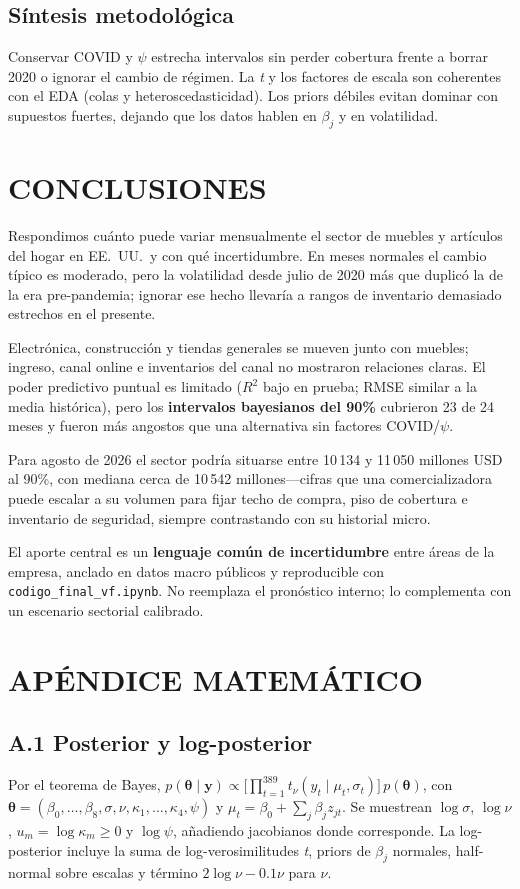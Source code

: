 \documentclass[twocolumn,10pt]{article}
\begin{document}
\subsection{Síntesis metodológica}
Conservar COVID y $\psi$ estrecha intervalos sin perder cobertura frente a borrar 2020 o ignorar el cambio de régimen. La \textit{t} y los factores de escala son coherentes con el EDA (colas y heteroscedasticidad). Los priors débiles evitan dominar con supuestos fuertes, dejando que los datos hablen en $\beta_j$ y en volatilidad.

\section{CONCLUSIONES}
Respondimos cuánto puede variar mensualmente el sector de muebles y artículos del hogar en EE.\ UU.\ y con qué incertidumbre. En meses normales el cambio típico es moderado, pero la volatilidad desde julio de 2020 más que duplicó la de la era pre-pandemia; ignorar ese hecho llevaría a rangos de inventario demasiado estrechos en el presente.

Electrónica, construcción y tiendas generales se mueven junto con muebles; ingreso, canal online e inventarios del canal no mostraron relaciones claras. El poder predictivo puntual es limitado ($R^2$ bajo en prueba; RMSE similar a la media histórica), pero los \textbf{intervalos bayesianos del 90\%} cubrieron 23 de 24 meses y fueron más angostos que una alternativa sin factores COVID/$\psi$.

Para agosto de 2026 el sector podría situarse entre 10\,134 y 11\,050 millones USD al 90\%, con mediana cerca de 10\,542 millones---cifras que una comercializadora puede escalar a su volumen para fijar techo de compra, piso de cobertura e inventario de seguridad, siempre contrastando con su historial micro.

El aporte central es un \textbf{lenguaje común de incertidumbre} entre áreas de la empresa, anclado en datos macro públicos y reproducible con \texttt{codigo\_final\_vf.ipynb}. No reemplaza el pronóstico interno; lo complementa con un escenario sectorial calibrado.

\onecolumn
\section*{APÉNDICE MATEMÁTICO}
\justifying

\subsection*{A.1 Posterior y log-posterior}
Por el teorema de Bayes,
$p(\boldsymbol{\theta}\mid\mathbf{y})\propto \big[\prod_{t=1}^{389} t_\nu(y_t\mid\mu_t,\sigma_t)\big]\,p(\boldsymbol{\theta})$,
con $\boldsymbol{\theta}=(\beta_0,\ldots,\beta_8,\sigma,\nu,\kappa_1,\ldots,\kappa_4,\psi)$ y $\mu_t=\beta_0+\sum_j\beta_j z_{jt}$. Se muestrean $\log\sigma$, $\log\nu$, $u_m=\log\kappa_m\ge 0$ y $\log\psi$, añadiendo jacobianos donde corresponde. La log-posterior incluye la suma de log-verosimilitudes \textit{t}, priors de $\beta_j$ normales, half-normal sobre escalas y término $2\log\nu-0.1\nu$ para $\nu$.
\end{document}
